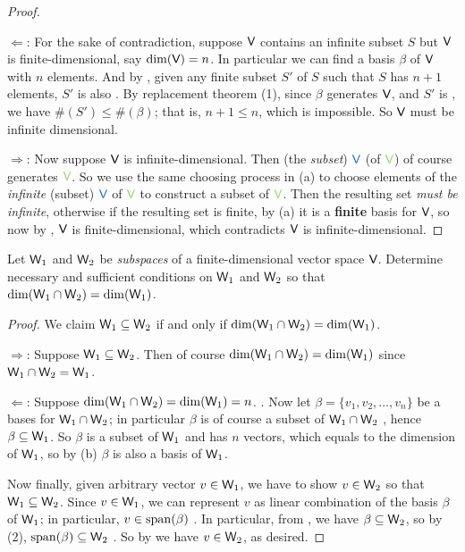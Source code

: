 \begin{proof} \ 

\(\Longleftarrow\): For the sake of contradiction, suppose \(\textsf{V}\) contains an infinite \LID{} subset \(S\) but \(\textsf{V}\) is finite-dimensional, say \(\dim(\textsf{V}) = n\).
In particular we can find a basis \(\beta\) of \(\textsf{V}\) with \(n\) elements.
And by , given any finite subset \(S'\) of \(S\) such that \(S\) has \(n + 1\) elements, \(S'\) is also \LID{}.
By replacement theorem (1), since \(\beta\) generates \(\textsf{V}\), and \(S'\) is \LID{}, we have \(\#(S') \le \#(\beta)\);
that is, \(n + 1 \le n\), which is impossible.
So \(\textsf{V}\) must be infinite dimensional.

\(\Longrightarrow\):
Now suppose \(\textsf{V}\) is infinite-dimensional.
Then (the \emph{subset}) \(\BLUE{\V}\) (of \(\GREEN{\V}\)) of course generates \(\GREEN{\V}\).
So we use the same choosing process in (a) to choose elements of the \emph{infinite} (subset) \(\BLUE{\V}\) of \(\GREEN{\V}\) to construct a \LID{} subset of \(\GREEN{\V}\).
Then the resulting set \emph{must be infinite}, otherwise if the resulting set is finite, by (a) it is a \textbf{finite} basis for \(\textsf{V}\), so now by , \(\textsf{V}\) is finite-dimensional, which contradicts \(\textsf{V}\) is infinite-dimensional.
\end{proof}

\begin{exercise} \label{exercise 1.6.22}
Let \(\textsf{W}_1\) and \(\textsf{W}_2\) be \emph{subspaces} of a finite-dimensional vector space \(\textsf{V}\).
Determine necessary and sufficient conditions on \(\textsf{W}_1\) and \(\textsf{W}_2\) so that \(\dim(\textsf{W}_1 \cap \textsf{W}_2) = \dim(\textsf{W}_1)\).
\end{exercise}

\begin{proof}
We claim \(\textsf{W}_1 \subseteq \textsf{W}_2\) if and only if \(\dim(\textsf{W}_1 \cap \textsf{W}_2) = \dim(\textsf{W}_1)\).

\(\Longrightarrow\): Suppose \(\textsf{W}_1 \subseteq \textsf{W}_2\).
Then of course \(\dim(\textsf{W}_1 \cap \textsf{W}_2) = \dim(\textsf{W}_1)\) since \(\textsf{W}_1 \cap \textsf{W}_2 = \textsf{W}_1\).

\(\Longleftarrow\):
Suppose \(\dim(\textsf{W}_1 \cap \textsf{W}_2) = \dim(\textsf{W}_1) = n\). .
Now let \(\beta = \{ v_1, v_2, ..., v_n \}\) be a bases for \(\textsf{W}_1 \cap \textsf{W}_2\); in particular \(\beta\) is of course a subset of \(\textsf{W}_1 \cap \textsf{W}_2\) , hence \(\beta \subseteq \textsf{W}_1\).
So \(\beta\) is a \LID{} subset of \(\textsf{W}_1\) and has \(n\) vectors, which equals to the dimension of \(\textsf{W}_1\), so by (b) \(\beta\) is also a basis of \(\textsf{W}_1\).

Now finally, given arbitrary vector \(v \in \textsf{W}_1\), we have to show \(v \in \textsf{W}_2\) so that \(\textsf{W}_1 \subseteq \textsf{W}_2\).
Since \(v \in \textsf{W}_1\), we can represent \(v\) as linear combination of the basis \(\beta\) of \(\textsf{W}_1\); in particular, \(v \in \operatorname{span}(\beta)\) .
In particular, from , we have \(\beta \subseteq \textsf{W}_2\), so by (2), \(\operatorname{span}(\beta) \subseteq \textsf{W}_2\) .
So by  we have \(v \in \textsf{W}_2\), as desired.
\end{proof}

